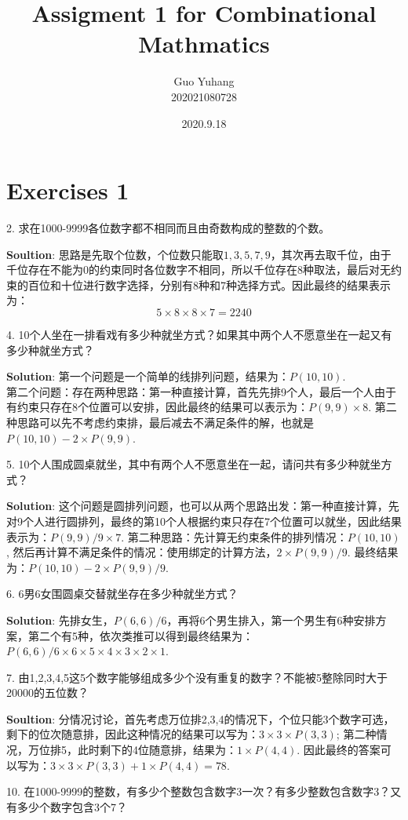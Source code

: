 \documentclass[a4paper]{ctexart}
\title{\textbf{Assigment 1 for Combinational Mathmatics}}
\date{2020.9.18}
\author{Guo Yuhang \\ 202021080728
}
\begin{document}
	\maketitle
	\section*{Exercises 1}
	2. 求在1000-9999各位数字都不相同而且由奇数构成的整数的个数。
	
	\textbf{Soultion}: 思路是先取个位数，个位数只能取$1,3,5,7,9$，其次再去取千位，由于千位存在不能为0的约束同时各位数字不相同，所以千位存在8种取法，最后对无约束的百位和十位进行数字选择，分别有8种和7种选择方式。因此最终的结果表示为：
	$$
	5\times 8\times 8 \times 7=2240
	$$
	
	4. 10个人坐在一排看戏有多少种就坐方式？如果其中两个人不愿意坐在一起又有多少种就坐方式？
	
	\textbf{Solution}: 第一个问题是一个简单的线排列问题，结果为：$P(10,10)$.\\
	第二个问题：存在两种思路：第一种直接计算，首先先排9个人，最后一个人由于有约束只存在8个位置可以安排，因此最终的结果可以表示为：$P(9,9)\times 8$. 第二种思路可以先不考虑约束排，最后减去不满足条件的解，也就是$P(10,10)-2\times P(9,9)$.
	
	5. 10个人围成圆桌就坐，其中有两个人不愿意坐在一起，请问共有多少种就坐方式？
	
	\textbf{Solution}: 这个问题是圆排列问题，也可以从两个思路出发：第一种直接计算，先对9个人进行圆排列，最终的第10个人根据约束只存在7个位置可以就坐，因此结果表示为：$P(9,9)/9\times 7$. 第二种思路：先计算无约束条件的排列情况：$P(10,10)$, 然后再计算不满足条件的情况：使用绑定的计算方法，$2\times P(9,9)/9$. 最终结果为：$P(10,10)-2\times P(9,9)/9$.
	
	6. 6男6女围圆桌交替就坐存在多少种就坐方式？
	
	\textbf{Solution}: 先排女生，$P(6,6)/6$，再将6个男生排入，第一个男生有6种安排方案，第二个有5种，依次类推可以得到最终结果为：$P(6,6)/6\times 6\times 5\times 4\times 3\times 2\times 1$.
	
	7. 由1,2,3,4,5这5个数字能够组成多少个没有重复的数字？不能被5整除同时大于20000的五位数？
	
	\textbf{Soultion}: 分情况讨论，首先考虑万位排2,3,4的情况下，个位只能3个数字可选，剩下的位次随意排，因此这种情况的结果可以写为：$3\times 3\times P(3,3)$; 第二种情况，万位排5，此时剩下的4位随意排，结果为：$1\times P(4,4)$. 因此最终的答案可以写为：$3\times 3\times P(3,3)+1\times P(4,4)=78$.
	
	10. 在1000-9999的整数，有多少个整数包含数字3一次？有多少整数包含数字3？又有多少个数字包含3个7？
	
\end{document}
